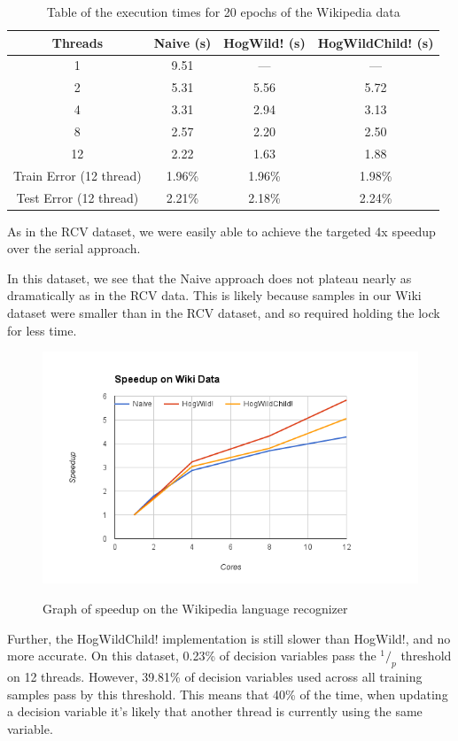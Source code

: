\documentclass{article}
\newcommand*\rfrac[2]{{}^{#1}\!/_{#2}}
\begin{document}
\begin{table}[h!]
\centering
\begin{tabular}{| c | c | c | c |}
\hline
Threads & Naive	(s)	& HogWild! (s)	& HogWildChild! (s) \\
\hline
1	& 9.51		& ---		& --- 	\\
2	& 5.31		& 5.56		& 5.72	\\
4	& 3.31		& 2.94		& 3.13	\\
8	& 2.57		& 2.20		& 2.50	\\
12	& 2.22		& 1.63		& 1.88	\\
\hline
Train Error (12 thread) & 1.96\%	& 1.96\%	& 1.98\% \\
Test Error  (12 thread) & 2.21\%	& 2.18\%	& 2.24\% \\
\hline
\end{tabular}
\label{tab-wiki}
\caption{Table of the execution times for 20 epochs of the Wikipedia data}
\end{table}

As in the RCV dataset, we were easily able to achieve the targeted 4x
speedup over the serial approach.

In this dataset, we see that the Naive approach does not plateau nearly
as dramatically as in the RCV data.
This is likely because samples in our Wiki dataset were smaller than in the
RCV dataset, and so required holding the lock for less time.

\begin{figure}[h!]
\centering
\includegraphics[width=\textwidth]{img/wiki_graph.png}
\label{wiki}
\caption{Graph of speedup on the Wikipedia language recognizer}
\end{figure}

Further, the HogWildChild! implementation is still slower than HogWild!,
and no more accurate.
On this dataset, 0.23\% of decision variables pass the $\rfrac 1 p$
threshold on 12 threads.
However, 39.81\% of decision variables used across all training samples
pass by this threshold.
This means that 40\% of the time, when updating a decision variable it's
likely that another thread is currently using the same variable.
\end{document}

